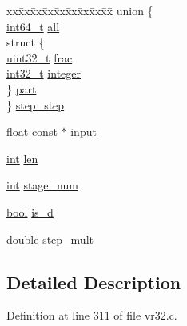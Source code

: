 \begin{DoxyCompactItemize}
\begin{tabbing}
\end{tabbing}\item 
\begin{tabbing}
xx\=xx\=xx\=xx\=xx\=xx\=xx\=xx\=xx\=\kill
union \{\\
\>\hyperlink{lib-src_2ffmpeg_2win32_2stdint_8h_a67a9885ef4908cb72ce26d75b694386c}{int64\_t} \hyperlink{structstream__t_a307812623a233a3b4daee8286f003f43}{all}\\
\>struct \{\\
\>\>\hyperlink{lib-src_2ffmpeg_2win32_2stdint_8h_a6eb1e68cc391dd753bc8ce896dbb8315}{uint32\_t} \hyperlink{structstream__t_a85ea5c6882b4dc232f1b496ebe25925c}{frac}\\
\>\>\hyperlink{lib-src_2ffmpeg_2win32_2stdint_8h_a37994e3b11c72957c6f454c6ec96d43d}{int32\_t} \hyperlink{structstream__t_acc952a91b88789c20bb3aac4fac13a56}{integer}\\
\>\} \hyperlink{structstream__t_a077b0dc83ed4a7cbcaa23534871fe69b}{part}\\
\} \hyperlink{structstream__t_aecc99ea2d956e1540e44aac80a5caa05}{step\_step}\\

\end{tabbing}\item 
float \hyperlink{getopt1_8c_a2c212835823e3c54a8ab6d95c652660e}{const} $\ast$ \hyperlink{structstream__t_a5fe10cfa36256c38bfad0da6120769d8}{input}
\item 
\hyperlink{xmltok_8h_a5a0d4a5641ce434f1d23533f2b2e6653}{int} \hyperlink{structstream__t_a03b3f0d8ec51ba97798f73a1362dd3fe}{len}
\item 
\hyperlink{xmltok_8h_a5a0d4a5641ce434f1d23533f2b2e6653}{int} \hyperlink{structstream__t_a37e6dc6284b2229dbfada6e29f82a698}{stage\+\_\+num}
\item 
\hyperlink{mac_2config_2i386_2lib-src_2libsoxr_2soxr-config_8h_abb452686968e48b67397da5f97445f5b}{bool} \hyperlink{structstream__t_a57458edeff5b2a372c764c28612baf1a}{is\+\_\+d}
\item 
double \hyperlink{structstream__t_a024424a394246496630e76adfb2800ae}{step\+\_\+mult}
\end{DoxyCompactItemize}


\subsection{Detailed Description}


Definition at line 311 of file vr32.\+c.



